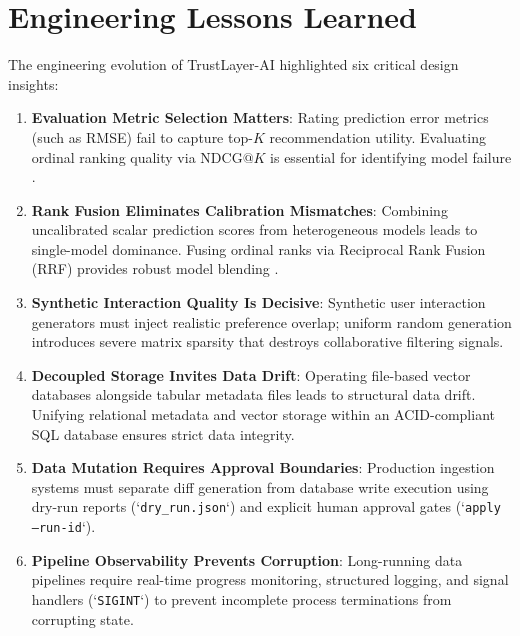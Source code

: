 \section{Engineering Lessons Learned}
The engineering evolution of TrustLayer-AI highlighted six critical design insights:
\begin{enumerate}
    \item \textbf{Evaluation Metric Selection Matters}: Rating prediction error metrics (such as RMSE) fail to capture top-$K$ recommendation utility. Evaluating ordinal ranking quality via $\text{NDCG}@K$ is essential for identifying model failure \cite{Jarvelin2002}.
    \item \textbf{Rank Fusion Eliminates Calibration Mismatches}: Combining uncalibrated scalar prediction scores from heterogeneous models leads to single-model dominance. Fusing ordinal ranks via Reciprocal Rank Fusion (RRF) provides robust model blending \cite{Cormack2009}.
    \item \textbf{Synthetic Interaction Quality Is Decisive}: Synthetic user interaction generators must inject realistic preference overlap; uniform random generation introduces severe matrix sparsity that destroys collaborative filtering signals.
    \item \textbf{Decoupled Storage Invites Data Drift}: Operating file-based vector databases alongside tabular metadata files leads to structural data drift. Unifying relational metadata and vector storage within an ACID-compliant SQL database ensures strict data integrity.
    \item \textbf{Data Mutation Requires Approval Boundaries}: Production ingestion systems must separate diff generation from database write execution using dry-run reports (`\texttt{dry\_run.json}`) and explicit human approval gates (`\texttt{apply --run-id}`).
    \item \textbf{Pipeline Observability Prevents Corruption}: Long-running data pipelines require real-time progress monitoring, structured logging, and signal handlers (`\texttt{SIGINT}`) to prevent incomplete process terminations from corrupting state.
\end{enumerate}

